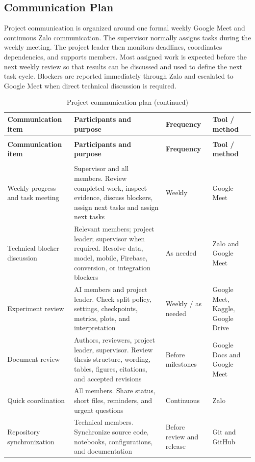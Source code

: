 \subsection{Communication Plan}
Project communication is organized around one formal weekly Google Meet and continuous Zalo communication. The supervisor normally assigns tasks during the weekly meeting. The project leader then monitors deadlines, coordinates dependencies, and supports members. Most assigned work is expected before the next weekly review so that results can be discussed and used to define the next task cycle. Blockers are reported immediately through Zalo and escalated to Google Meet when direct technical discussion is required.\par
\begingroup
\CVioTableSetup
\begin{longtable}{|>{\centering\arraybackslash}p{2.45cm}|>{\centering\arraybackslash}p{4.90cm}|>{\centering\arraybackslash}p{1.43cm}|>{\centering\arraybackslash}p{1.97cm}|}
\caption{Project communication plan}\\
\hline
\rowcolor{cvioPeach}\textbf{Communication item} & \textbf{Participants and purpose} & \textbf{Frequency} & \textbf{Tool / method} \\ \hline
\endfirsthead
\caption[]{Project communication plan (continued)}\\
\hline
\rowcolor{cvioPeach}\textbf{Communication item} & \textbf{Participants and purpose} & \textbf{Frequency} & \textbf{Tool / method} \\ \hline
\endhead
\hline
\multicolumn{4}{r}{\footnotesize Continued on next page}\\
\endfoot
\hline
\endlastfoot
Weekly progress and task meeting & Supervisor and all members. Review completed work, inspect evidence, discuss blockers, assign next tasks and assign next tasks & Weekly & Google Meet \\ \hline
Technical blocker discussion & Relevant members; project leader; supervisor when required. Resolve data, model, mobile, Firebase, conversion, or integration blockers & As needed & Zalo and Google Meet \\ \hline
Experiment review & AI members and project leader. Check split policy, settings, checkpoints, metrics, plots, and interpretation & Weekly / as needed & Google Meet, Kaggle, Google Drive \\ \hline
Document review & Authors, reviewers, project leader, supervisor. Review thesis structure, wording, tables, figures, citations, and accepted revisions & Before milestones & Google Docs and Google Meet \\ \hline
Quick coordination & All members. Share status, short files, reminders, and urgent questions & Continuous & Zalo \\ \hline
Repository synchronization & Technical members. Synchronize source code, notebooks, configurations, and documentation & Before review and release & Git and GitHub \\ \hline
\end{longtable}
